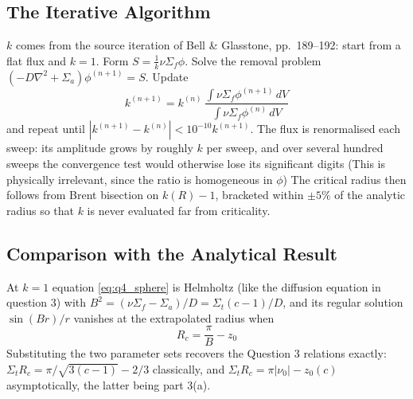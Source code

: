 \documentclass[11pt]{article}
\begin{document}
\subsection*{The Iterative Algorithm}

$k$ comes from the source iteration of Bell \& Glasstone, pp.~189--192: start from a flat flux and $k = 1$. Form $S = \frac{1}{k}\nu\Sigma_f\phi$. Solve the removal problem $(-D\nabla^2 + \Sigma_a)\phi^{(n+1)} = S$. Update
\begin{equation}
    k^{(n+1)} = k^{(n)} \, \frac{\int \nu \Sigma_f \phi^{(n+1)} \, dV}{\int \nu \Sigma_f \phi^{(n)} \, dV}
\end{equation}
and repeat until $|k^{(n+1)} - k^{(n)}| < 10^{-10} k^{(n+1)}$. The flux is renormalised each sweep: its amplitude grows by roughly $k$ per sweep, and over several hundred sweeps the convergence test would otherwise lose its significant digits (This is physically irrelevant, since the ratio is homogeneous in $\phi$)
The critical radius then follows from Brent bisection on $k(R) - 1$, bracketed within $\pm 5\%$ of the analytic radius so that $k$ is never evaluated far from criticality.

\subsection*{Comparison with the Analytical Result}

At $k = 1$ equation \eqref{eq:q4_sphere} is Helmholtz (like the diffusion equation in question 3) with $B^2 = (\nu\Sigma_f - \Sigma_a)/D = \Sigma_t(c-1)/D$, and its regular solution $\sin(Br)/r$ vanishes at the extrapolated radius when
\begin{equation}
    R_c = \frac{\pi}{B} - z_0
    \label{eq:q4_analytic}
\end{equation}
Substituting the two parameter sets recovers the Question 3 relations exactly: $\Sigma_t R_c = \pi/\sqrt{3(c-1)} - 2/3$ classically, and $\Sigma_t R_c = \pi|\nu_0| - z_0(c)$ asymptotically, the latter being part 3(a).
\end{document}
